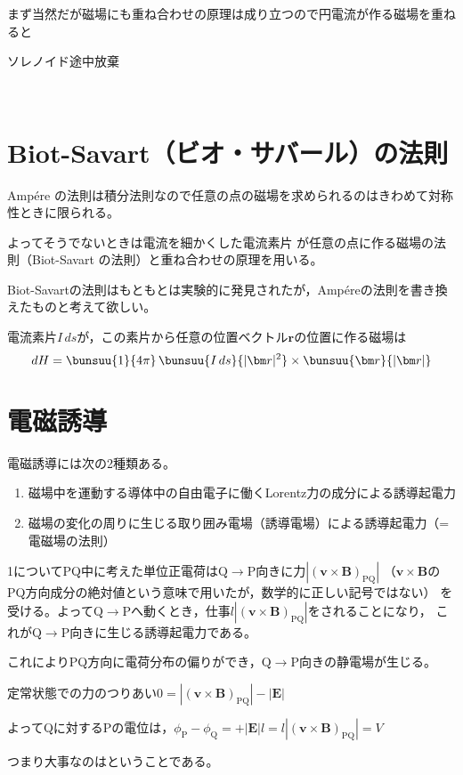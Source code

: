   まず当然だが磁場にも重ね合わせの原理は成り立つので円電流が作る磁場を重ねると

  ソレノイド途中放棄


  ﻿\section{Biot-Savart（ビオ・サバール）の法則}

  Ampére の法則は積分法則なので任意の点の磁場を求められるのはきわめて対称性ときに限られる。

  よってそうでないときは電流を細かくした電流素片
  が任意の点に作る磁場の法則（Biot-Savart の法則）と重ね合わせの原理を用いる。

  Biot-Savartの法則はもともとは実験的に発見されたが，Ampéreの法則を書き換えたものと考えて欲しい。

  電流素片$I\,ds$が，この素片から任意の位置ベクトル$\bm r$の位置に作る磁場は
  $$dH=\bunsuu{1}{4\pi}\,\bunsuu{I\,ds}{|\bm r|^2}\times \bunsuu{\bm r}{|\bm r|}$$

 \section{電磁誘導}

 電磁誘導には次の2種類ある。
 \begin{enumerate}
  \item 磁場中を運動する導体中の自由電子に働くLorentz力の成分による誘導起電力
  \item 磁場の変化の周りに生じる取り囲み電場（誘導電場）による誘導起電力（=電磁場の法則）
 \end{enumerate}
 \ajMaru 1についてPQ中に考えた単位正電荷は$\mathrm{Q\to P}$向きに力$|(\bm v\times\bm B)_{\mathrm{PQ}}|$%
 （$\bm v\times\bm B$のPQ方向成分の絶対値という意味で用いたが，数学的に正しい記号ではない）
 を受ける。よって$\mathrm{Q\to P}$へ動くとき，仕事$l|(\bm v\times\bm B)_{\mathrm{PQ}}|$をされることになり，
 これが$\mathrm{Q\to P}$向きに生じる誘導起電力である。

 これによりPQ方向に電荷分布の偏りができ，$\mathrm{Q\to P}$向きの静電場が生じる。

 定常状態での力のつりあい$0=|(\bm v\times\bm B)_{\mathrm{PQ}}|-|\bm E|$

 よってQに対するPの電位は，$\phi_\text{P}-\phi_\text{Q}=+|\bm E|l=l|(\bm v\times\bm B)_{\mathrm{PQ}}|=V$

 つまり大事なのはということである。

